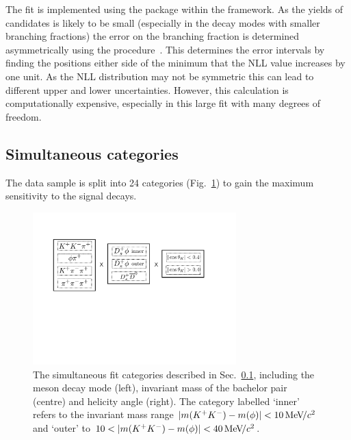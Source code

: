 The fit is implemented using the \roofit package within the \root framework. 
As the yields of candidates is likely to be small (especially in the \Dsp decay modes with smaller branching fractions) the error on the branching fraction is determined asymmetrically using the \minos procedure~\cite{James:1994vla}. This determines the error intervals by finding the positions either side of the minimum that the NLL value increases by one unit. As the NLL distribution may not be symmetric this can lead to different upper and lower uncertainties. However, this calculation is computationally expensive, especially in this large fit with many degrees of freedom.  


\subsection{Simultaneous categories}
\label{sec:B2DsPhi_fit_cats}

The data sample is split into 24 categories (Fig.~\ref{fig:B2DsPhi_simfit}) to gain the maximum sensitivity to the signal decays.

\begin{figure}[!h]
    \centering
    \includegraphics[width=0.7\textwidth]{figs/B2DsPhi/simfit_cats.pdf}
    \caption{The simultaneous fit categories described in Sec.~\ref{sec:B2DsPhi_fit_cats}, including the \Dsp meson decay mode (left), invariant mass of the bachelor \Kp\Km pair (centre) and helicity angle (right). The category labelled `\Dsp\phiz inner' refers to the invariant mass range $|m({{K}^+}{{K}^-})-m(\phi)|<10{\mathrm{\,Me\kern -0.1em V\!/}c^2}$ and `\Dsp\phiz outer' to $10<|m(\Kp\Km)-m(\phiz)|<40\mevcc$. }
    \label{fig:B2DsPhi_simfit}   
\end{figure}


